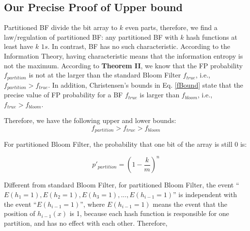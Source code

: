 \subsection{Our Precise Proof of Upper bound}
Partitioned BF divide the bit array to $k$ even parts, therefore, we find a law/regulation of partitioned BF: any partitioned BF with $k$ hash functions at least have $k$ $1s$. In contrast, BF has no such characteristic. According to the Information Theory, having characteristic means that the information entropy is not the maximum. 
According to \textbf{Theorem II}, we know that the FP probability $f_{partition}$ is not at the 
larger than the standard Bloom Filter  $f_{true}$, i.e., $f_{partition} > f_{true}$. In addition, Christensen’s bounds in Eq. \ref{fBound} state that the precise value of FP probability for a BF $f_{true}$ is larger than $f_{bloom}$, i.e., $f_{true} > f_{bloom}$.


Therefore, we have the following upper and lower bounds:
\begin{equation}
\label{bigbig}
f_{partition} > f_{true} > f_{bloom}
\end{equation}



For partitioned Bloom Filter, the probability that one bit of the array is still 0 is:

\begin{equation}
p'_{partition}=\left( 1-\dfrac{k}{m} \right)^n
\end{equation}

Different from standard Bloom Filter, for partitioned Bloom Filter, the event ``$E(h_1=1),E(h_2=1),E(h_3=1),...,E(h_{i-1}=1)$'' is independent with the event ``$E(h_{i-1}=1)$'', where $E(h_{i-1}=1)$ means the event that the position of $h_{i-1}(x)$ is 1, because each hash function is responsible for one partition, and has no effect with each other. Therefore, 

